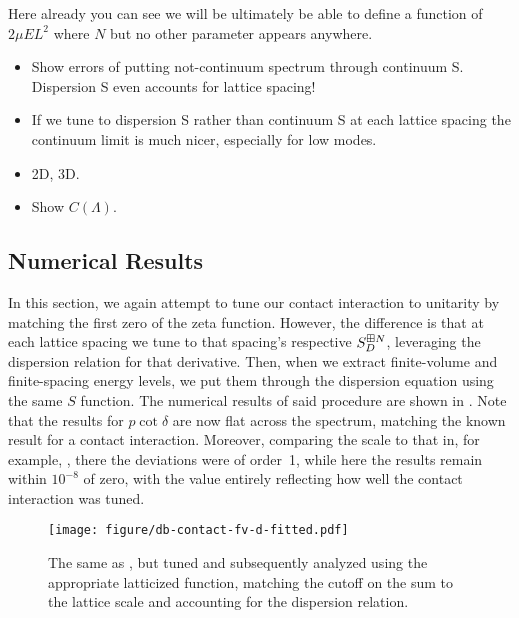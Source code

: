Here already you can see we will be ultimately be able to define a function of $2\mu E L^2$ where $N$ but no other parameter appears anywhere.


\begin{itemize}
    \item Show errors of putting not-continuum spectrum through continuum S.  Dispersion S even accounts for lattice spacing!
    \item If we tune to dispersion S rather than continuum S at each lattice spacing the continuum limit is much nicer, especially for low modes.
    \item 2D, 3D.
    \item Show $C(\Lambda)$.
\end{itemize}

\subsection{Numerical Results}

In this section, we again attempt to tune our contact interaction to unitarity by matching the first zero of the \Luscher zeta function.
However, the difference is that at each lattice spacing we tune to that spacing's respective $S^{\boxplus N}_D$, leveraging the dispersion relation for that derivative.
Then, when we extract finite-volume and finite-spacing energy levels, we put them through the dispersion equation  using the same $S$ function.
The numerical results of said procedure are shown in .
Note that the results for $p\cot\delta$ are now flat across the spectrum, matching the known result for a contact interaction.
Moreover, comparing the scale to that in, for example, , there the deviations were of order~1, while here the results remain within $10^{-8}$ of zero, with the value entirely reflecting how well the contact interaction was tuned.

\begin{figure}
    \texttt{[image: figure/db-contact-fv-d-fitted.pdf]}
    \caption{The same as , but tuned and subsequently analyzed using the appropriate latticized \Luscher function, matching the cutoff on the sum to the lattice scale and accounting for the dispersion relation.}
    \label{fig:unimproved dispersion}
\end{figure}

